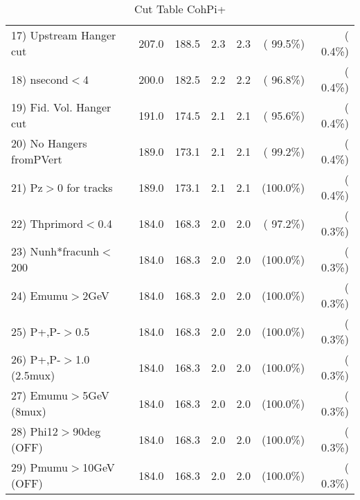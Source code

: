 \begin{table}[h!]
\begin{tabular}{||l||r|r|r|r|r|r||}
 17) Upstream Hanger cut  &        207.0 &        188.5 &          2.3 &          2.3 & ( 99.5\%) & (  0.4\%) \\
 18) nsecond$<$4          &        200.0 &        182.5 &          2.2 &          2.2 & ( 96.8\%) & (  0.4\%) \\
 19) Fid. Vol. Hanger cut &        191.0 &        174.5 &          2.1 &          2.1 & ( 95.6\%) & (  0.4\%) \\
 20) No Hangers fromPVert &        189.0 &        173.1 &          2.1 &          2.1 & ( 99.2\%) & (  0.4\%) \\
 21) Pz$>$0 for tracks    &        189.0 &        173.1 &          2.1 &          2.1 & (100.0\%) & (  0.4\%) \\
 22) Thprimord$<$0.4      &        184.0 &        168.3 &          2.0 &          2.0 & ( 97.2\%) & (  0.3\%) \\
 23) Nunh*fracunh$<$200   &        184.0 &        168.3 &          2.0 &          2.0 & (100.0\%) & (  0.3\%) \\
 24) Emumu$>$2GeV         &        184.0 &        168.3 &          2.0 &          2.0 & (100.0\%) & (  0.3\%) \\
 25) P+,P-$>$0.5          &        184.0 &        168.3 &          2.0 &          2.0 & (100.0\%) & (  0.3\%) \\
 26) P+,P-$>$1.0 (2.5mux) &        184.0 &        168.3 &          2.0 &          2.0 & (100.0\%) & (  0.3\%) \\
 27) Emumu$>$5GeV  (8mux) &        184.0 &        168.3 &          2.0 &          2.0 & (100.0\%) & (  0.3\%) \\
 28) Phi12$>$90deg  (OFF) &        184.0 &        168.3 &          2.0 &          2.0 & (100.0\%) & (  0.3\%) \\
 29) Pmumu$>$10GeV  (OFF) &        184.0 &        168.3 &          2.0 &          2.0 & (100.0\%) & (  0.3\%) \\
 \hline
 \hline
 \end{tabular}
 \caption{Cut Table  CohPi+   }
 \label{tab-cutcohjpsi-mumu_cohpip}
 \end{table}
